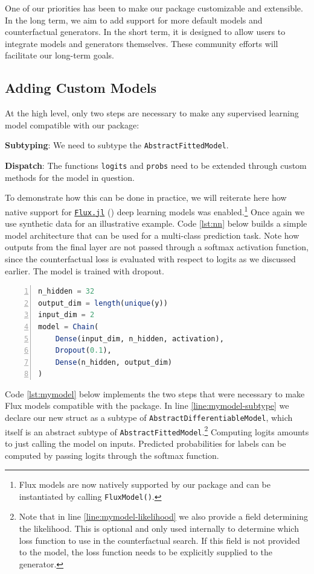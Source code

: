 \documentclass[
  letterpaper,
  DIV=11,
  numbers=noendperiod]{scrartcl}
\begin{document}
One of our priorities has been to make our package customizable and
extensible. In the long term, we aim to add support for more default
models and counterfactual generators. In the short term, it is designed
to allow users to integrate models and generators themselves. These
community efforts will facilitate our long-term goals.

\hypertarget{sec-custom-mod}{%
\subsection{Adding Custom Models}\label{sec-custom-mod}}

At the high level, only two steps are necessary to make any supervised
learning model compatible with our package:

\begin{unnumlist}
\item \textbf{Subtyping}: We need to subtype the \texttt{AbstractFittedModel}.
\item \textbf{Dispatch}: The functions \texttt{logits} and \texttt{probs} need to be extended through custom methods for the model in question.
\end{unnumlist}

To demonstrate how this can be done in practice, we will reiterate here
how native support for \href{https://fluxml.ai/}{\texttt{Flux.jl}}
(\cite{innes2018flux}) deep learning models was enabled.\footnote{Flux
  models are now natively supported by our package and can be
  instantiated by calling \texttt{FluxModel()}.} Once again we use
synthetic data for an illustrative example. Code \ref{lst:nn} below
builds a simple model architecture that can be used for a multi-class
prediction task. Note how outputs from the final layer are not passed
through a softmax activation function, since the counterfactual loss is
evaluated with respect to logits as we discussed earlier. The model is
trained with dropout.

\begin{lstlisting}[language=Julia, escapechar=@, numbers=left, label={lst:nn}, caption={A simple neural network model.}]
n_hidden = 32
output_dim = length(unique(y))
input_dim = 2
model = Chain(
    Dense(input_dim, n_hidden, activation),
    Dropout(0.1),
    Dense(n_hidden, output_dim)
)  
\end{lstlisting}

Code \ref{lst:mymodel} below implements the two steps that were
necessary to make Flux models compatible with the package. In line
\ref{line:mymodel-subtype} we declare our new struct as a subtype of
\texttt{AbstractDifferentiableModel}, which itself is an abstract
subtype of \texttt{AbstractFittedModel}.\footnote{Note that in line
  \ref{line:mymodel-likelihood} we also provide a field determining the
  likelihood. This is optional and only used internally to determine
  which loss function to use in the counterfactual search. If this field
  is not provided to the model, the loss function needs to be explicitly
  supplied to the generator.} Computing logits amounts to just calling
the model on inputs. Predicted probabilities for labels can be computed
by passing logits through the softmax function.
\end{document}

